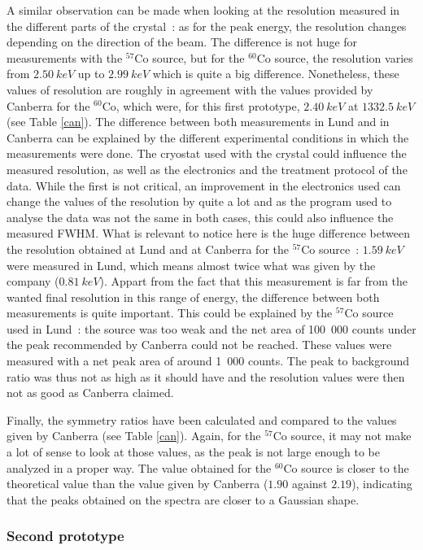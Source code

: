 \documentclass[11pt,a4paper]{article}
\begin{document}
A similar observation can be made when looking at the resolution measured in the different parts of the crystal~: as for the peak energy, the resolution changes depending on the direction of the beam. The difference is not huge for measurements with the $^{57}$Co source, but for the $^{60}$Co source, the resolution varies from $2.50~keV$ up to $2.99~keV$ which is quite a big difference. Nonetheless, these values of resolution are roughly in agreement with the values provided by Canberra for the $^{60}$Co, which were, for this first prototype, $2.40~keV$ at $1332.5~keV$ (see Table \ref{can}). The difference between both measurements in Lund and in Canberra can be explained by the different experimental conditions in which the measurements were done. The cryostat used with the crystal could influence the measured resolution, as well as the electronics and the treatment protocol of the data. While the first is not critical, an improvement in the electronics used can change the values of the resolution by quite a lot and as the program used to analyse the data was not the same in both cases, this could also influence the measured FWHM. What is relevant to notice here is the huge difference between the resolution obtained at Lund and at Canberra for the $^{57}$Co source~: $1.59~keV$ were measured in Lund, which means almost twice what was given by the company ($0.81~keV$). Appart from the fact that this measurement is far from the wanted final resolution in this range of energy, the difference between both measurements is quite important. This could be explained by the $^{57}$Co source used in Lund~: the source was too weak and the net area of 100~000 counts under the peak recommended by Canberra could not be reached. These values were measured with a net peak area of around 1~000 counts. The peak to background ratio was thus not as high as it should have and the resolution values were then not as good as Canberra claimed.

Finally, the symmetry ratios have been calculated and compared to the values given by Canberra (see Table \ref{can}). Again, for the $^{57}$Co source, it may not make a lot of sense to look at those values, as the peak is not large enough to be analyzed in a proper way. The value obtained for the $^{60}$Co source is closer to the theoretical value than the value given by Canberra ($1.90$ against $2.19$), indicating that the peaks obtained on the spectra are closer to a Gaussian shape.

\subsubsection{Second prototype}
\end{document}
